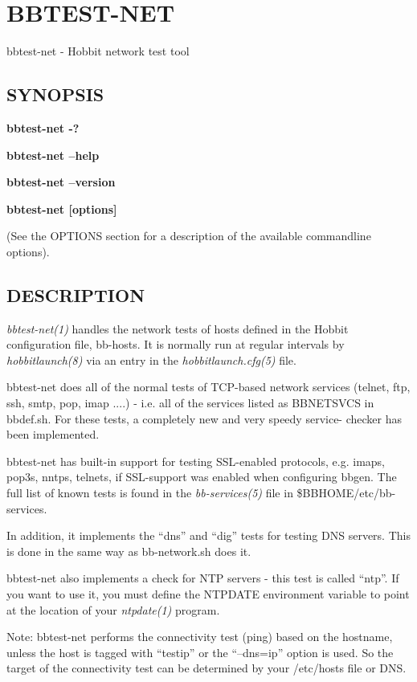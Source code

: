 \section{BBTEST-NET}
 bbtest-net - Hobbit network test tool 

\subsection{SYNOPSIS}
\textbf{bbtest-net -?}
 
\textbf{bbtest-net --help}
 
\textbf{bbtest-net --version}
 
\textbf{bbtest-net [options]}
 
 (See the OPTIONS section for a description of the available commandline options). 

 
\subsection{DESCRIPTION}
\emph{bbtest-net(1)} handles the network tests of hosts defined in the
Hobbit configuration file, bb-hosts. It is normally run at regular
intervals by \emph{hobbitlaunch(8)} via an entry in the
\emph{hobbitlaunch.cfg(5)} file. 

 bbtest-net does all of the normal tests of TCP-based network services
 (telnet, ftp, ssh, smtp, pop, imap ....) - i.e. all of the services
 listed as BBNETSVCS in bbdef.sh. For these tests, a completely new
 and very speedy service- checker has been implemented. 



  bbtest-net has built-in support for testing SSL-enabled protocols,
  e.g. imaps, pop3s, nntps, telnets, if SSL-support was enabled when
  configuring bbgen. The full list of known tests is found in the
  \emph{bb-services(5)} file in \$BBHOME/etc/bb-services. 



  In addition, it implements the ``dns'' and ``dig'' tests for testing
  DNS servers. This is done in the same way as bb-network.sh does it. 


  bbtest-net also implements a check for NTP servers - this test is
  called ``ntp''. If you want to use it, you must define the NTPDATE
  environment variable to point at the location of your
  \emph{ntpdate(1)} program. 



  Note: bbtest-net performs the connectivity test (ping) based on the
  hostname, unless the host is tagged with ``testip'' or the
  ``--dns=ip'' option is used. So the target of the connectivity test
  can be determined by your /etc/hosts file or DNS. 



